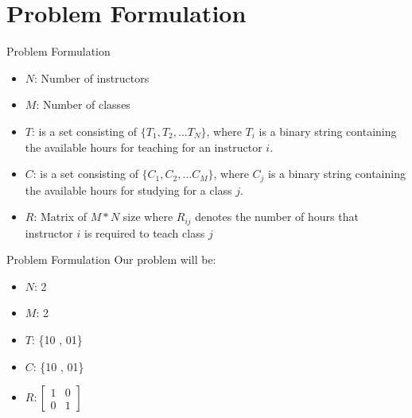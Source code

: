 \documentclass[14pt, aspectratio=169]{beamer}
\begin{document}

\section{Problem Formulation}

\begin{frame}{Problem Formulation}
    \begin{itemize}
        \item $N$: Number of instructors
        \item $M$: Number of classes
        \item $T$: is a set consisting of \(\{T_1, T_2, ...T_N\}\), where $T_i$ is a binary string containing the available hours for teaching for an instructor $i$.
        \item $C$: is a set consisting of \(\{C_1, C_2, ...C_M\}\), where $C_j$ is a binary string containing the available hours for studying for a class $j$.
        \item $R$: Matrix of \(M*N\) size where \(R_{ij}\) denotes the number of hours that instructor $i$ is required to teach class $j$
    \end{itemize}
\end{frame}

\begin{frame}{Problem Formulation}
    Our problem will be:
    \vspace{0.2cm}
    \begin{itemize}
        \item $N$: 2
        \item $M$: 2
        \item $T$: \{10 , 01\}
        \item $C$: \{10 , 01\}
        \item $R:
                  \begin{bmatrix}
                      1 & 0 \\
                      0 & 1
                  \end{bmatrix}$
    \end{itemize}
\end{frame}
\end{document}
